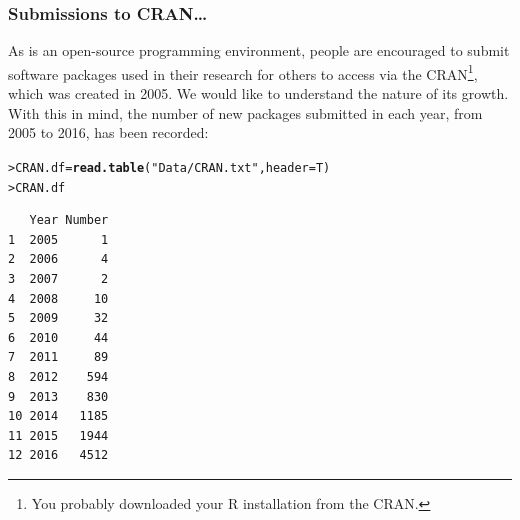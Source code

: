 \documentclass{beamer}\usepackage[]{graphicx}\usepackage[]{xcolor}
\makeatletter
\newcommand{\hlstr}[1]{\textcolor[rgb]{0.192,0.494,0.8}{#1}}%
\newcommand{\hlstd}[1]{\textcolor[rgb]{0.345,0.345,0.345}{#1}}%
\newcommand{\hlkwb}[1]{\textcolor[rgb]{0.69,0.353,0.396}{#1}}%
\newcommand{\hlkwc}[1]{\textcolor[rgb]{0.333,0.667,0.333}{#1}}%
\newcommand{\hlkwd}[1]{\textcolor[rgb]{0.737,0.353,0.396}{\textbf{#1}}}%
\newenvironment{kframe}{%
 \def\at@end@of@kframe{}%
 \ifinner\ifhmode%
  \def\at@end@of@kframe{\end{minipage}}%
  \begin{minipage}{\columnwidth}%
 \fi\fi%
 \def\FrameCommand##1{\hskip\@totalleftmargin \hskip-\fboxsep
 \colorbox{shadecolor}{##1}\hskip-\fboxsep
     \hskip-\linewidth \hskip-\@totalleftmargin \hskip\columnwidth}%
 \MakeFramed {\advance\hsize-\width
   \@totalleftmargin\z@ \linewidth\hsize
   \@setminipage}}%
 {\par\unskip\endMakeFramed%
 \at@end@of@kframe}
\newenvironment{knitrout}{}{} %
\makeatother
\begin{document}
\begin{frame}[fragile]
\frametitle{Submissions to CRAN\ldots}

As  is an open-source programming environment, people are encouraged to submit software packages used in their research for others to access via the CRAN\footnote{You probably downloaded your R installation from the CRAN.}, which was created in 2005. We would like to understand the nature of its growth. With this in mind, the number of new packages submitted in each year, from 2005 to 2016, has been recorded:

\begin{knitrout}\scriptsize
{}\color{fgcolor}\begin{kframe}
\begin{alltt}
\hlstd{> }\hlstd{CRAN.df} \hlkwb{=} \hlkwd{read.table}\hlstd{(}\hlstr{"Data/CRAN.txt"}\hlstd{,} \hlkwc{header}\hlstd{=T)}
\hlstd{> }\hlstd{CRAN.df}
\end{alltt}
\begin{verbatim}
   Year Number
1  2005      1
2  2006      4
3  2007      2
4  2008     10
5  2009     32
6  2010     44
7  2011     89
8  2012    594
9  2013    830
10 2014   1185
11 2015   1944
12 2016   4512
\end{verbatim}
\end{kframe}
\end{knitrout}

\end{frame}
\end{document}
